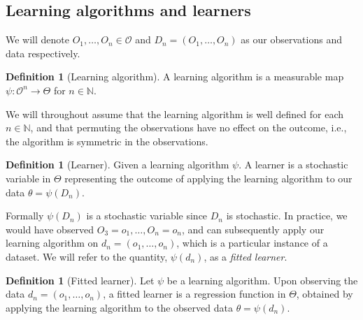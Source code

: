 \documentclass[11pt, a4paper]{article}
\theoremstyle{definition}
\newtheorem{definition}[theorem]{Definition}
\theoremstyle{remark}
\newcommand{\btheta}{\theta}
\newcommand{\la}{\psi}
\begin{document}
\subsection{Learning algorithms and learners}
We will denote $ O_1 , \dots , O_n \in \mathcal{O} $ and $ D_n = (O_1 , \dots , O_n) $ as our observations and data respectively. 
\begin{definition}[Learning algorithm]
    A learning algorithm is a measurable map $ \la : \mathcal{O}^{n} \to \Theta $ for $ n \in \mathbb{N} $. 
\end{definition}
We will throughout assume that the learning algorithm is well defined for each $ n \in \mathbb{N} $, and that permuting the observations have no effect on the outcome, i.e., the algorithm is symmetric in the observations.  
\begin{definition}[Learner]
    Given a learning algorithm $ \la $. A learner is a stochastic variable in $ \Theta $ representing the outcome of applying the learning algorithm to our data $ \btheta = \la(D_n) $.
\end{definition}
Formally $ \la(D_n) $ is a stochastic variable since $ D_n $ is stochastic. In practice, we would have observed $ O_3 = o_1, \dots, O_n = o_n $, and can subsequently apply our learning algorithm on $ d_n = (o_1 , \dots , o_n) $, which is a particular instance of a dataset. We will refer to the quantity, $ \la(d_n) $, as a \textit{fitted learner}. 

\begin{definition}[Fitted learner]
    Let $ \la $ be a learning algorithm. Upon observing the data $ d_n = (o_1, \dots , o_n) $, a fitted learner is a regression function in $ \Theta $, obtained by applying the learning algorithm to the observed data $ \btheta = \la(d_n) $.
\end{definition}
\end{document}

